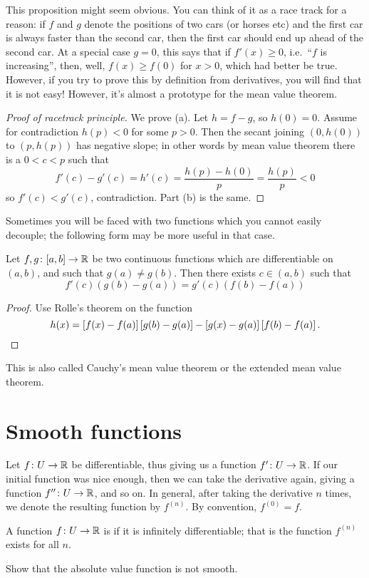 This proposition might seem obvious.
You can think of it as a race track for a reason:
if $f$ and $g$ denote the positions of two cars (or horses etc)
and the first car is always faster than the second car,
then the first car should end up ahead of the second car.
At a special case $g = 0$, this says that if $f'(x) \ge 0$,
i.e.\ ``$f$ is increasing'',
then, well, $f(x) \ge f(0)$ for $x > 0$, which had better be true.
However, if you try to prove this by definition from derivatives,
you will find that it is not easy!
However, it's almost a prototype for the mean value theorem.

\begin{proof}
	[Proof of racetrack principle]
	We prove (a). Let $h = f-g$, so $h(0) = 0$.
	Assume for contradiction $h(p) < 0$ for some $p > 0$.
	Then the secant joining $(0, h(0))$ to $(p, h(p))$ has negative slope;
	in other words by mean value theorem there is a $0 < c < p$
	such that
	\[ f'(c) - g'(c) = h'(c) = \frac{h(p)-h(0)}{p} = \frac{h(p)}{p} < 0 \]
	so $f'(c) < g'(c)$, contradiction.
	Part (b) is the same.
\end{proof}

Sometimes you will be faced with two functions which you cannot
easily decouple; the following form may be more useful in that case.
\begin{theorem}
	Let $f, g \colon [a,b] \to \mathbb R$ be two continuous functions
	which are differentiable on $(a,b)$,
	and such that $g(a) \neq g(b)$.
	Then there exists $c \in (a,b)$ such that 
	\[ f'(c)(g(b)-g(a)) = g'(c)(f(b)-f(a)) \]
\end{theorem}
\begin{proof}
	Use Rolle's theorem on the function
	\[ h(x) = \left[ f(x)-f(a) \right] \left[ g(b)-g(a) \right]
		- \left[ g(x)-g(a) \right] \left[ f(b)-f(a) \right].  \qedhere \]
\end{proof}
This is also called Cauchy's mean value theorem
or the extended mean value theorem.

\section{Smooth functions}

Let $f \colon U \to \mathbb R$ be differentiable,
thus giving us a function $f' \colon U \to \mathbb R$.
If our initial function was nice enough,
then we can take the derivative again,
giving a function $f'' \colon U \to \mathbb R$, and so on.
In general, after taking the derivative $n$ times,
we denote the resulting function by $f^{(n)}$.
By convention, $f^{(0)} = f$.
\begin{definition}
	A function $f \colon U \to \mathbb R$ is 
	if it is infinitely differentiable;
	that is the function $f^{(n)}$ exists for all $n$.
\end{definition}
\begin{ques}
	Show that the absolute value function is not smooth.
\end{ques}

